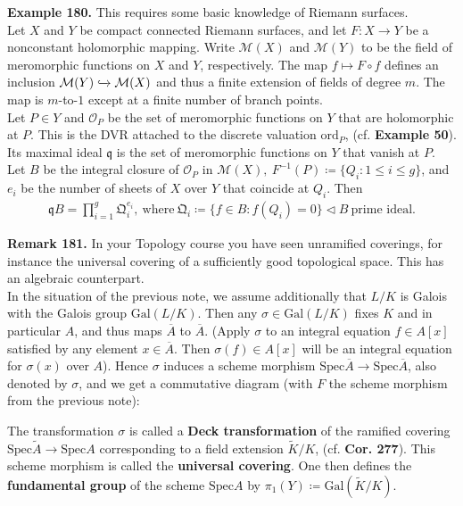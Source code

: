 \documentclass[12pt,a4paper,footinclude=true,headinclude=true]{scrbook} %
\newenvironment{remark}[2][Remark]
    { \begin{mdframed}[backgroundcolor=gray!20] \textbf{#1 #2.} }
    {  \end{mdframed}}
\newenvironment{example}[2][Example]
    { \begin{mdframed}[backgroundcolor=gray!20] \textbf{#1 #2.} }
    {  \end{mdframed}}
\begin{document}
\begin{example}{180}
    This requires some basic knowledge of Riemann surfaces.\\
    Let $X$ and $Y$ be compact connected Riemann surfaces, and let $F:X\to Y$ be a nonconstant holomorphic mapping. Write $\mathcal{M}(X)$ and $\mathcal{M}(Y)$ to be the field of meromorphic functions on $X$ and $Y$, respectively. The map $f\mapsto F\circ f$ defines an inclusion $\mathcal{M}(Y)\xhookrightarrow{} \mathcal{M}(X)$ and thus a finite extension of fields of degree $m$. The map is $m$-to-$1$ except at a finite number of branch points.\\ Let $P\in Y$ and $\mathcal{O}_P$ be the set of meromorphic functions on $Y$ that are holomorphic at $P$. This is the DVR attached to the discrete valuation $\mathrm{ord}_P$, (cf. \textbf{Example 50}). Its maximal ideal $\mathfrak{q}$ is the set of meromorphic functions on $Y$ that vanish at $P$. \\ Let $B$ be the integral closure of $\mathcal{O}_P$ in $\mathcal{M}(X),\ F^{-1}(P)\coloneqq\{Q_i:1\leq i\leq g\}$, and $e_i$ be the number of sheets of $X$ over $Y$ that coincide at $Q_i$. Then 
    \begin{align*}
        \mathfrak{q}B=\prod_{i=1}^g\mathfrak{Q}_i^{e_i},\ \text{where}\ \mathfrak{Q}_i\coloneqq\{f\in B:f(Q_i)=0\}\triangleleft B\ \text{prime ideal}.
    \end{align*}
\end{example}
\newpage
\begin{remark}{181}
    In your Topology course you have seen unramified coverings, for instance the universal covering of a sufficiently good topological space. This has an algebraic counterpart.\\
    In the situation of the previous note, we assume additionally that $L/K$ is Galois with the Galois group $\mathrm{Gal}(L/K)$. Then any $\sigma\in\mathrm{Gal}(L/K)$ fixes $K$ and in particular $A$, and thus maps $\overline{A}$ to $\overline{A}$. (Apply $\sigma$ to an integral equation $f\in A[x]$ satisfied by any element $x\in\overline{A}$. Then $\sigma(f)\in A[x]$ will be an integral equation for $\sigma(x)$ over $A$). Hence $\sigma$ induces a scheme morphism $\mathrm{Spec}\overline{A}\to\mathrm{Spec} \overline{A}$, also denoted by $\sigma$, and we get a commutative diagram (with $F$ the scheme morphism from the previous note):
    \begin{center}
    \end{center}
    The transformation $\sigma$ is called a \textbf{Deck transformation} of the ramified covering $\mathrm{Spec}\widetilde{A}\to\mathrm{Spec}A$ corresponding to a field extension $\widetilde{K}/K$, (cf. \textbf{Cor. 277}). This scheme morphism is called the \textbf{universal covering}. One then defines the \textbf{fundamental group} of the scheme $\mathrm{Spec}A$ by $\pi_1(Y)\coloneqq\mathrm{Gal}(\widetilde{K}/K)$.
\end{remark}
\end{document}
